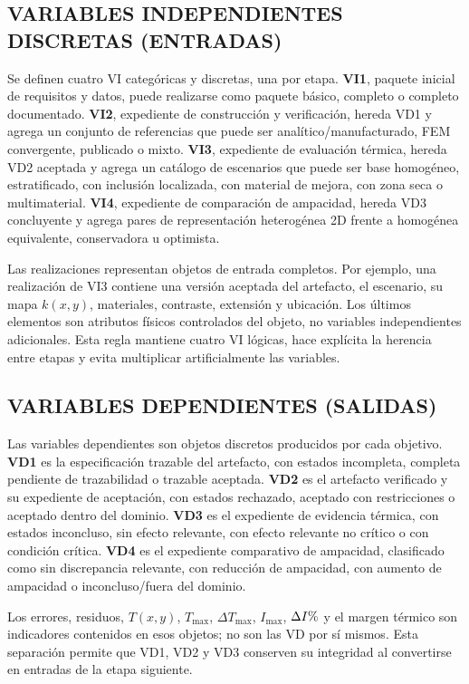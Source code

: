 \documentclass[11pt,a4paper,oneside]{report}
\newcommand{\Tmax}{T_{\max}}
\newcommand{\Imax}{I_{\max}}
\newcommand{\kx}{k(x,y)}
\newcommand{\pct}{\mbox{\char37}}
\begin{document}
\subsection{VARIABLES INDEPENDIENTES DISCRETAS (ENTRADAS)}

Se definen cuatro VI categóricas y discretas, una por etapa. \textbf{VI1}, paquete inicial de requisitos y datos, puede realizarse como paquete básico, completo o completo documentado. \textbf{VI2}, expediente de construcción y verificación, hereda VD1 y agrega un conjunto de referencias que puede ser analítico/manufacturado, FEM convergente, publicado o mixto. \textbf{VI3}, expediente de evaluación térmica, hereda VD2 aceptada y agrega un catálogo de escenarios que puede ser base homogéneo, estratificado, con inclusión localizada, con material de mejora, con zona seca o multimaterial. \textbf{VI4}, expediente de comparación de ampacidad, hereda VD3 concluyente y agrega pares de representación heterogénea 2D frente a homogénea equivalente, conservadora u optimista.

Las realizaciones representan objetos de entrada completos. Por ejemplo, una realización de VI3 contiene una versión aceptada del artefacto, el escenario, su mapa $\kx$, materiales, contraste, extensión y ubicación. Los últimos elementos son atributos físicos controlados del objeto, no variables independientes adicionales. Esta regla mantiene cuatro VI lógicas, hace explícita la herencia entre etapas y evita multiplicar artificialmente las variables.

\subsection{VARIABLES DEPENDIENTES (SALIDAS)}

Las variables dependientes son objetos discretos producidos por cada objetivo. \textbf{VD1} es la especificación trazable del artefacto, con estados incompleta, completa pendiente de trazabilidad o trazable aceptada. \textbf{VD2} es el artefacto verificado y su expediente de aceptación, con estados rechazado, aceptado con restricciones o aceptado dentro del dominio. \textbf{VD3} es el expediente de evidencia térmica, con estados inconcluso, sin efecto relevante, con efecto relevante no crítico o con condición crítica. \textbf{VD4} es el expediente comparativo de ampacidad, clasificado como sin discrepancia relevante, con reducción de ampacidad, con aumento de ampacidad o inconcluso/fuera del dominio.

Los errores, residuos, $T(x,y)$, $\Tmax$, $\Delta\Tmax$, $\Imax$, $\Delta I\pct$ y el margen térmico son indicadores contenidos en esos objetos; no son las VD por sí mismos. Esta separación permite que VD1, VD2 y VD3 conserven su integridad al convertirse en entradas de la etapa siguiente.
\end{document}
